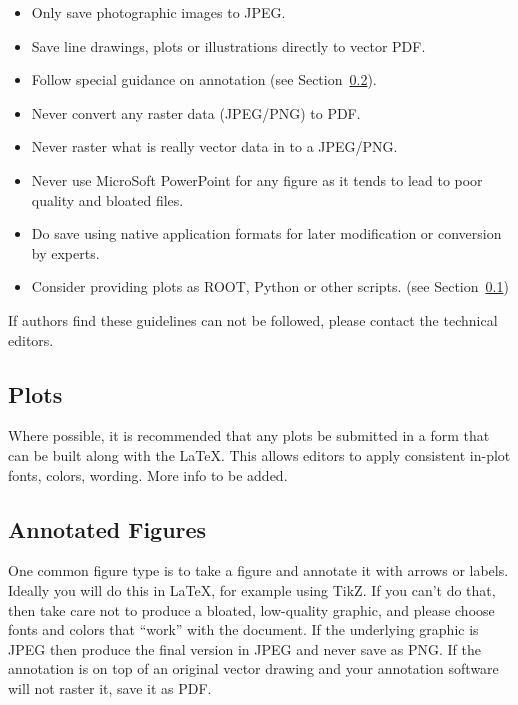 \begin{itemize}
\item Only save photographic images to JPEG.
\item Save line drawings, plots or illustrations directly to vector PDF.
\item Follow special guidance on annotation (see Section~\ref{sec:annotate}).
\item Never convert any raster data (JPEG/PNG) to PDF.
\item Never raster what is really vector data in to a JPEG/PNG.
\item Never use MicroSoft PowerPoint for any figure as it tends to lead to poor quality and bloated files.
\item Do save using native application formats for later modification or conversion by experts.
\item Consider providing plots as ROOT, Python or other scripts.  (see Section~\ref{sec:plots})
\end{itemize}

\noindent If authors find these guidelines can not be followed, please contact the technical editors.   

\subsection{Plots}
\label{sec:plots}

Where possible, it is recommended that any plots be submitted in a form that can be built along with the \LaTeX.  This allows editors to apply consistent in-plot fonts, colors, wording.  More info to be added.

\subsection{Annotated Figures}
\label{sec:annotate}

One common figure type is to take a figure and annotate it with arrows or labels.  Ideally you will do this in 
LaTeX, for example using TikZ.  If you can't do that, then take care not to produce a bloated, low-quality graphic, and please choose fonts and colors that ``work'' with the document.  If the underlying graphic is JPEG then produce the final version in JPEG and never save as PNG.  If the annotation is on top of an original vector drawing and your annotation software will not raster it, save it as PDF.

